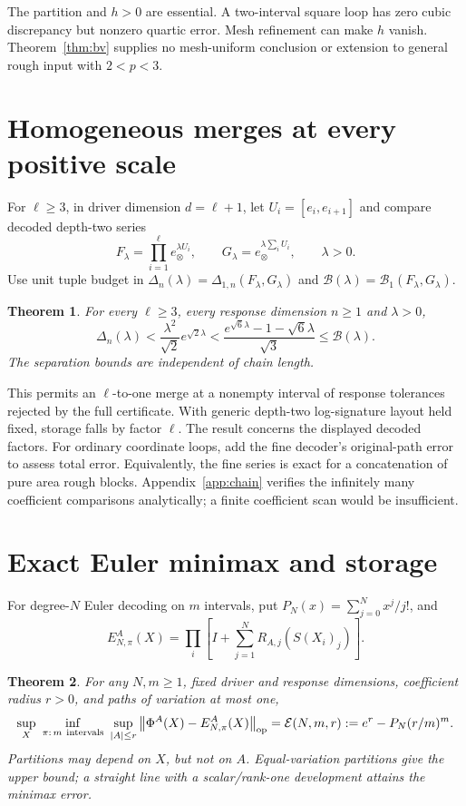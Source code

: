 \documentclass[11pt,a4paper]{article}
\newtheorem{theorem}{Theorem}
\newcommand{\op}{\mathrm{op}}
\newcommand{\E}{\mathcal E}
\newcommand{\B}{\mathcal B}
\newcommand{\Del}{\Delta}
\newcommand{\norm}[1]{\left\lVert#1\right\rVert}
\begin{document}
The partition and \(h>0\) are essential. A two-interval square loop has
zero cubic discrepancy but nonzero quartic error. Mesh refinement can make
\(h\) vanish. Theorem~\ref{thm:bv} supplies no mesh-uniform conclusion or
extension to general rough input with \(2<p<3\).

\section{Homogeneous merges at every positive scale}
For \(\ell\ge3\), in driver dimension \(d=\ell+1\), let
\(U_i=[e_i,e_{i+1}]\) and compare decoded depth-two series
\[
 F_\lambda=\prod_{i=1}^{\ell}e_\otimes^{\lambda U_i},\qquad
 G_\lambda=e_\otimes^{\lambda\sum_iU_i},\qquad \lambda>0.
\]
Use unit tuple budget in \(\Del_n(\lambda)=\Del_{1,n}(F_\lambda,G_\lambda)\)
and \(\B(\lambda)=\B_1(F_\lambda,G_\lambda)\).

\begin{theorem}\label{thm:chain}
For every \(\ell\ge3\), every response dimension \(n\ge1\) and \(\lambda>0\),
\begin{equation}\label{eq:chain}
 \Del_n(\lambda)
 <\frac{\lambda^2}{\sqrt2}e^{\sqrt2\lambda}
 <\frac{e^{\sqrt6\lambda}-1-\sqrt6\lambda}{\sqrt3}
 \le\B(\lambda).
\end{equation}
The separation bounds are independent of chain length.
\end{theorem}

This permits an \(\ell\)-to-one merge at a nonempty interval of response
tolerances rejected by the full certificate. With generic depth-two
log-signature layout held fixed, storage falls by factor \(\ell\).
The result concerns the displayed decoded factors. For ordinary coordinate
loops, add the fine decoder's original-path error to assess total error.
Equivalently, the fine series is exact for a concatenation of pure area
rough blocks. Appendix~\ref{app:chain} verifies the infinitely many coefficient
comparisons analytically; a finite coefficient scan would be insufficient.

\section{Exact Euler minimax and storage}
For degree-\(N\) Euler decoding on \(m\) intervals, put
\(P_N(x)=\sum_{j=0}^Nx^j/j!\), and
\[
 E^A_{N,\pi}(X)=\prod_i
 \left[I+\sum_{j=1}^NR_{A,j}(S(X_i)_j)\right].
\]

\begin{theorem}\label{thm:euler}
For any \(N,m\ge1\), fixed driver and response dimensions, coefficient radius
\(r>0\), and paths of variation at most one,
\begin{equation}\label{eq:minimax}
 \sup_X\ \inf_{\pi:\,m\ {\rm intervals}}\ \sup_{|A|\le r}
 \norm{\Phi^A(X)-E^A_{N,\pi}(X)}_{\op}
 =\E(N,m,r):=e^r-P_N(r/m)^m.
\end{equation}
Partitions may depend on \(X\), but not on \(A\).
Equal-variation partitions give the upper bound; a straight line with
a scalar/rank-one development attains the minimax error.
\end{theorem}
\end{document}
